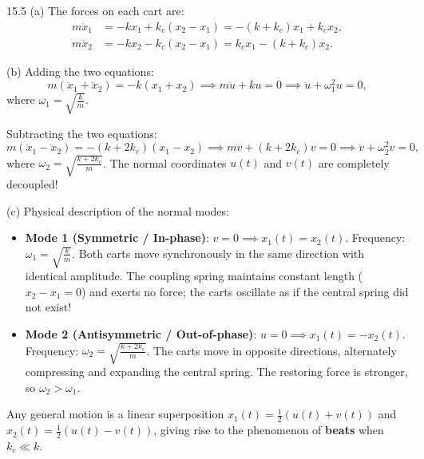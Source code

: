 \begin{solution}{15.5}
(a) The forces on each cart are:
\begin{align*}
m\ddot{x}_1 &= -kx_1 + k_c(x_2 - x_1) = -(k + k_c)x_1 + k_c x_2, \\
m\ddot{x}_2 &= -kx_2 - k_c(x_2 - x_1) = k_c x_1 - (k + k_c)x_2.
\end{align*}

(b) Adding the two equations:
\[
m(\ddot{x}_1 + \ddot{x}_2) = -k(x_1 + x_2) \implies m\ddot{u} + k u = 0 \implies \boxed{\ddot{u} + \omega_1^2 u = 0,}
\]
where $\omega_1 = \sqrt{\frac{k}{m}}$.

Subtracting the two equations:
\[
m(\ddot{x}_1 - \ddot{x}_2) = -(k + 2k_c)(x_1 - x_2) \implies m\ddot{v} + (k + 2k_c)v = 0 \implies \boxed{\ddot{v} + \omega_2^2 v = 0,}
\]
where $\omega_2 = \sqrt{\frac{k + 2k_c}{m}}$.
The normal coordinates $u(t)$ and $v(t)$ are completely decoupled!

(c) Physical description of the normal modes:
\begin{itemize}[leftmargin=1.4em,itemsep=2pt]
  \item \textbf{Mode 1 (Symmetric / In-phase)}: $v = 0 \implies x_1(t) = x_2(t)$.
  Frequency: $\boxed{\omega_1 = \sqrt{\frac{k}{m}}}$.
  Both carts move synchronously in the same direction with identical amplitude. The coupling spring maintains constant length ($x_2 - x_1 = 0$) and exerts no force; the carts oscillate as if the central spring did not exist!
  \item \textbf{Mode 2 (Antisymmetric / Out-of-phase)}: $u = 0 \implies x_1(t) = -x_2(t)$.
  Frequency: $\boxed{\omega_2 = \sqrt{\frac{k + 2k_c}{m}}}$.
  The carts move in opposite directions, alternately compressing and expanding the central spring. The restoring force is stronger, so $\omega_2 > \omega_1$.
\end{itemize}
Any general motion is a linear superposition $x_1(t) = \frac{1}{2}(u(t) + v(t))$ and $x_2(t) = \frac{1}{2}(u(t) - v(t))$, giving rise to the phenomenon of \textbf{beats} when $k_c \ll k$.
\end{solution}

